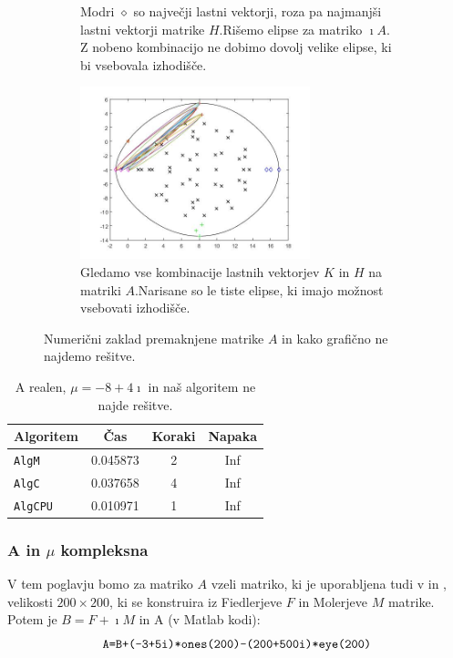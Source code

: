 \documentclass[12pt,a4paper]{amsart}
\theoremstyle{definition}
\theoremstyle{plain}
\begin{document}
\begin{figure}[H]
\begin{subfigure}[t]{0.45\textwidth}
\caption{Modri $\diamond$ so največji lastni vektorji, roza pa najmanjši lastni vektorji matrike $H$.\footnotemark[\value{footnote}] Rišemo elipse za matriko $\imath A$. Z nobeno kombinacijo ne dobimo dovolj velike elipse, ki bi vsebovala izhodišče.}
\label{fig:p63}
\end{subfigure}%
\hfill
\begin{subfigure}[t]{0.45\textwidth}
\includegraphics[width=0.9\linewidth,height=5cm]{RC4e3.jpg}
\caption{Gledamo vse kombinacije lastnih vektorjev $K$ in $H$ na matriki $A$.\footnotemark[\value{footnote}] Narisane so le tiste elipse, ki imajo možnost vsebovati izhodišče.}
\label{fig:p63}
\end{subfigure}
\caption{Numerični zaklad premaknjene matrike $A$ in kako grafično ne najdemo rešitve.}
\end{figure}

\begin{table}[H]
\caption{A realen, $\mu = -8+4\imath$ in naš algoritem ne najde rešitve.}
\begin{tabular}{|l|c|c|c|}
\hline
Algoritem & Čas & Koraki & Napaka\\
\hline
\hline
\verb+AlgM+ &0.045873&2&Inf\\
\hline
\verb+AlgC+ &0.037658 &4& Inf\\
\hline
\verb+AlgCPU+ &0.010971&1&Inf \\
\hline
\end{tabular}

\label{t6}
\end{table}

\subsubsection{A in $\mu$ kompleksna}
V tem poglavju bomo za matriko $A$ vzeli matriko,  ki je uporabljena tudi v \cite{meurant} in \cite{trije}, velikosti $200\times 200$, ki se konstruira iz Fiedlerjeve $F$ in Molerjeve $M$ matrike. Potem je $B=F + \imath M$ in A (v Matlab kodi):
$$\verb~A=B+(-3+5i)*ones(200)-(200+500i)*eye(200)~$$
\end{document}
